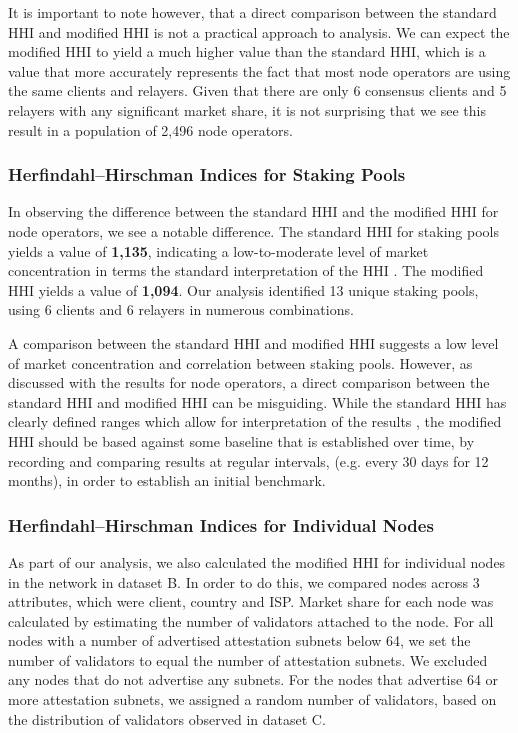 \documentclass[conference]{IEEEtran}
\begin{document}
It is important to note however, that a direct comparison between the standard HHI and modified HHI is not a practical approach to analysis. We can expect the modified HHI to yield a much higher value than the standard HHI, which is a value that more accurately represents the fact that most node operators are using the same clients and relayers.  Given that there are only 6 consensus clients and 5 relayers with any significant market share, it is not surprising that we see this result in a population of 2,496 node operators. 

\subsubsection{Herfindahl–Hirschman Indices for Staking Pools}

In observing the difference between the standard HHI and the modified HHI for node operators, we see a notable difference.  The standard HHI for staking pools yields a value of \textbf{1,135}, indicating a low-to-moderate level of market concentration in terms the standard interpretation of the HHI \cite{usdoj2015}.  The modified HHI yields a value of \textbf{1,094}.  Our analysis identified 13 unique staking pools, using 6 clients and 6 relayers in numerous combinations.

A comparison between the standard HHI and modified HHI suggests a low level of market concentration and correlation between staking pools.  However, as discussed with the results for node operators, a direct comparison between the standard HHI and modified HHI can be misguiding.  While the standard HHI has clearly defined ranges which allow for interpretation of the results \cite{usdoj2015}, the modified HHI should be based against some baseline that is established over time, by recording and comparing results at regular intervals, (e.g. every 30 days for 12 months), in order to establish an initial benchmark.

\subsubsection{Herfindahl–Hirschman Indices for Individual Nodes}
\label{sec:herfindahl–hirschman-indices-for-individual-nodes}

As part of our analysis, we also calculated the modified HHI for individual nodes in the network in dataset B.  In order to do this, we compared nodes across 3 attributes, which were client, country and ISP.  Market share for each node was calculated by estimating the number of validators attached to the node.  For all nodes with a number of advertised attestation subnets below 64, we set the number of validators to equal the number of attestation subnets.  We excluded any nodes that do not advertise any subnets.  For the nodes that advertise 64 or more attestation subnets, we assigned a random number of validators, based on the distribution of validators observed in dataset C.
\end{document}
